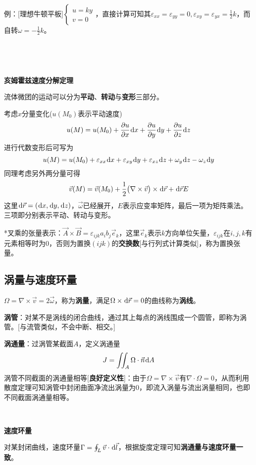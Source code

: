 \documentclass[a4paper,UTF8,fontset=windows]{ctexart}
\newcommand*{\dr}{\hspace{0.07em}\mathrm{d}}
\begin{document}
\

例：[理想牛顿平板]$\begin{cases}u=ky\\v=0\end{cases}$，直接计算可知其$\varepsilon_{xx}=\varepsilon_{yy}=0,\varepsilon_{xy}=\varepsilon_{yx}=\frac{1}{2}k$，而自转$\omega=-\frac{1}{2}k$。

\

\

\textbf{亥姆霍兹速度分解定理}

流体微团的运动可以分为\textbf{平动}、\textbf{转动}与\textbf{变形}三部分。

考虑$x$分量变化($u(M_0)$表示平动速度)
$$u(M)=u(M_0)+\frac{\partial u}{\partial x}\dr x+\frac{\partial u}{\partial y}\dr y+\frac{\partial u}{\partial z}\dr z$$
进行代数变形后可写为
$$u(M)=u(M_0)+\varepsilon_{xx}\dr x+\varepsilon_{xy}\dr y+\varepsilon_{xz}\dr z+\omega_y\dr z-\omega_z\dr y$$
同理考虑另外两分量可得
$$\vec{v}(M)=\vec{v}(M_0)+\frac{1}{2}\big(\nabla\times\vec{v}\big)\times\dr\vec{r}+\dr\vec{r}E$$
这里$\dr\vec{r}=(\dr x,\dr y,\dr z)$，$\vec{\omega}$已经展开，$E$表示应变率矩阵，最后一项为矩阵乘法。三项即分别表示平动、转动与变形。

*叉乘的张量表示：$\vec{A}\times\vec{B}=\varepsilon_{ijk}a_ib_j\vec{e}_k$，这里$\vec{e}_k$表示$k$方向单位矢量，$\varepsilon_{ijk}$在$i,j,k$有元素相等时为0，否则为置换$(ijk)$的\textbf{交换数}[与行列式计算类似]，称为置换张量。

\subsection{涡量与速度环量}

$\Omega=\nabla\times\vec{v}=2\vec{\omega}$，称为\textbf{涡量}，满足$\Omega\times\dr\vec{r}=0$的曲线称为\textbf{涡线}。

\textbf{涡管}：对某不是涡线的闭合曲线，通过其上每点的涡线围成一个圆管，即称为涡管。[与流管类似，不会中断、相交。]

\textbf{涡通量}：过涡管某截面$A$，定义涡通量
$$J=\iint_A\Omega\cdot\vec{n}\dr A$$
涡管不同截面的涡通量相等[\textbf{良好定义性}]：由于$\Omega=\nabla\times\vec{v}$有$\nabla\cdot\Omega=0$，从而利用散度定理可知涡管中封闭曲面净流出涡量为0，即流入涡量与流出涡量相同，也即不同截面涡通量相等。

\

\textbf{速度环量}

对某封闭曲线，速度环量$\Gamma=\oint_L\vec{v}\cdot\dr\vec{l}$，根据旋度定理可知\textbf{涡通量与速度环量一致}。
\end{document}
